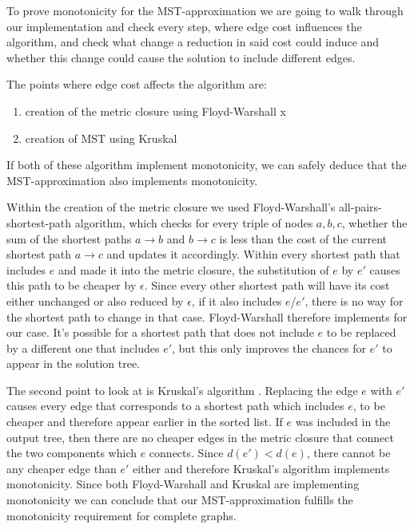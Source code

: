 To prove monotonicity for the MST-approximation we are going to walk through our implementation and check every step, where edge cost influences the algorithm, and check what change a reduction in said cost could induce and whether this change could cause the solution to include different edges.

The points where edge cost affects the algorithm are:
\begin{enumerate}
\item creation of the metric closure using Floyd-Warshall x
\item creation of MST using Kruskal
\end{enumerate}

If both of these algorithm implement monotonicity, we can safely deduce that the MST-approximation also implements monotonicity.

Within the creation of the metric closure we used Floyd-Warshall's all-pairs-shortest-path algorithm, which checks for every triple of nodes $a,b,c$, whether the sum of the shortest paths $a\to b$ and $b\to c$ is less than the cost of the current shortest path $a\to c$ and updates it accordingly. Within every shortest path that includes $e$ and made it into the metric closure, the substitution of $e$ by $e'$ causes this path to be cheaper by $\epsilon$. Since every other shortest path will have its cost either unchanged or also reduced by $\epsilon$, if it also includes $e$/$e'$, there is no way for the shortest path to change in that case. Floyd-Warshall therefore implements for our case. It's possible for a shortest path that does not include $e$ to be replaced by a different one that includes $e'$, but this only improves the chances for $e'$ to appear in the solution tree.

The second point to look at is Kruskal's algorithm \cite{kruskal1956shortest}. Replacing the edge $e$ with $e'$ causes every edge that corresponds to a shortest path which includes $e$, to be cheaper and therefore appear earlier in the sorted list. If $e$ was included in the output tree, then there are no cheaper edges in the metric closure that connect the two components which $e$ connects. Since $d(e')<d(e)$, there cannot be any cheaper edge than $e'$ either and therefore Kruskal's algorithm implements monotonicity. Since both Floyd-Warshall and Kruskal are implementing monotonicity we can conclude that our MST-approximation fulfills the monotonicity requirement for complete graphs. 


